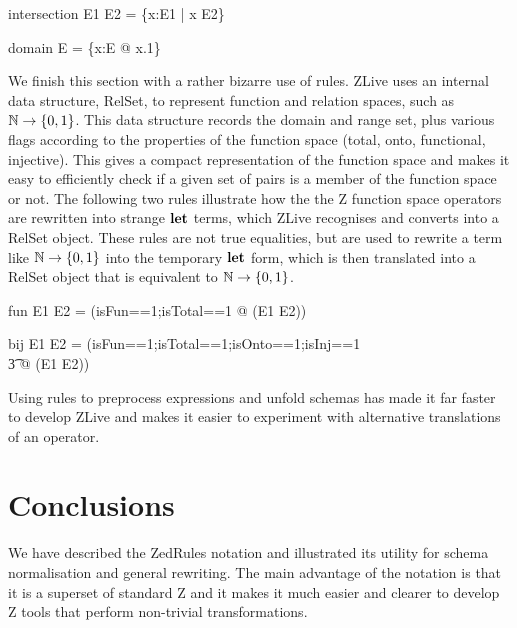 \documentclass{entcs}
\begin{document}
\begin{zedrule}{intersection}
   E1 \cap E2 = \{x:E1 | x \in E2\}
\end{zedrule}
\begin{zedrule}{domain}
   \dom E = \{x:E @ x.1\}
\end{zedrule}

We finish this section with a rather bizarre use of rules.  ZLive uses
an internal data structure, RelSet, to represent function and relation
spaces, such as $\nat \fun \{0,1\}$.  This data structure records the
domain and range set, plus various flags according to the properties
of the function space (total, onto, functional, injective).  This
gives a compact representation of the function space and makes it easy
to efficiently check if a given set of pairs is a member of the
function space or not.  The following two rules illustrate how the the
Z function space operators are rewritten into strange $\mathop{\mathstrut{\mbox{\textbf{let}}}}\nolimits$ terms,
which ZLive recognises and converts into a RelSet object.  These rules
are not true equalities, but are used to rewrite a term like $\nat
\fun \{0,1\}$ into the temporary $\mathop{\mathstrut{\mbox{\textbf{let}}}}\nolimits$ form, which is then translated
into a RelSet object that is equivalent to $\nat \fun \{0,1\}$.

\begin{zedrule}{fun}
   E1 \fun E2 = (\LET isFun==1;isTotal==1 @ \power (E1 \cross E2))
\end{zedrule}
\begin{zedrule}{bij}
   E1 \bij E2 = (\LET isFun==1;isTotal==1;isOnto==1;isInj==1 \\
   \t3               @ \power (E1 \cross E2))
\end{zedrule}

Using rules to preprocess expressions and unfold schemas has made it
far faster to develop ZLive and makes it easier to experiment with
alternative translations of an operator.




\section{Conclusions} \label{sec:concl}

We have described the ZedRules notation and illustrated its utility
for schema normalisation and general rewriting.  The main advantage
of the notation is that it is a superset of standard Z and it makes it
much easier and clearer to develop Z tools that perform non-trivial
transformations.
\end{document}
